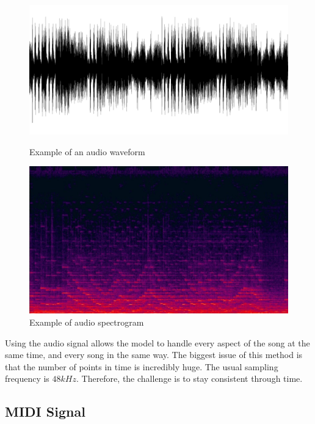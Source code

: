 \documentclass[12pt]{report}
\begin{document}
\begin{figure}[H]
   \begin{minipage}{0.5\textwidth}
     \centering
     \includegraphics[width=.9\linewidth]{images/music/waveform/waveform.png}
     \caption{Example of an audio waveform}
     \label{fig:waveform_example}
   \end{minipage}\hfill
   \begin{minipage}{0.5\textwidth}
     \centering
     \includegraphics[width=\linewidth]{images/music/spectrogram/spectrogram.jpg}
     \caption{Example of audio spectrogram}
     \label{fig:spectrogram_example}
   \end{minipage}
\end{figure}

Using the audio signal allows the model to handle every aspect of the song at the same time, and every song in the same way.
The biggest issue of this method is that the number of points in time is incredibly huge. The usual sampling frequency is $48kHz$. 
Therefore, the challenge is to stay consistent through time.

\subsection{MIDI Signal}
\end{document}
